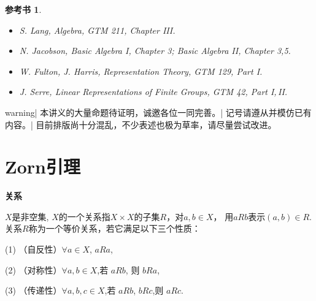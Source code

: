 \newcommand{\Ker}{\operatorname{Ker}}
\renewcommand{\Im}{\operatorname{Im}}
\newcommand{\Hom}{\operatorname{Hom}}
\newcommand{\End}{\operatorname{End}}
\newtheorem{exercise}{练习}
\newtheorem*{books}{参考书}

\begin{center}
\end{center}

\begin{books}
\begin{itemize}
    \item[①] S. Lang, \textit{Algebra}, GTM 211, Chapter III.\\
    \item[②] N. Jacobson, \textit{Basic Algebra I}, Chapter 3; 
    \textit{Basic Algebra II}, Chapter 3,5.\\
    \item[③] W. Fulton, J. Harris, \textit{Representation Theory}, 
    GTM 129, Part I.\\
    \item[④] J. Serre, \textit{Linear Representations of Finite Groups}, 
    GTM 42, Part I,\,II.
\end{itemize}
\end{books}
{{warning|
本讲义的大量命题待证明，诚邀各位一同完善。|
记号请遵从并模仿已有内容。|
目前排版尚十分混乱，不少表述也极为草率，请尽量尝试改进。}}

\section{Zorn引理}

\begin{definition} \textbf{关系}\par
		$X$是非空集, $X$的一个关系指$X \times X$的子集$R$，对$a,b \in X$，
        用$aRb$表示$(a,b) \in R$. 关系$R$称为一个等价关系，若它满足以下三个性质：\par
		\qquad (1) （自反性）$\forall a \in X$, $aRa$, \par
		\qquad (2) （对称性）$\forall a,b \in X$,若 $aRb$, 则 $bRa$, \par
		\qquad (3) （传递性）$\forall a,b,c \in X$,若 $aRb$, $bRc$,则 $aRc$.

	\end{definition}

